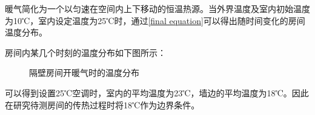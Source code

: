 暖气简化为一个以匀速在空间内上下移动的恒温热源。当外界温度及室内初始温度为10℃，室内设定温度为25℃时，通过\eqref{final equation}可以得出随时间变化的房间温度分布。

房间内某几个时刻的温度分布如下图所示：
\\
\begin{figure}[h]
    \centering
    \qquad
    \qquad
    \qquad
    \qquad
    
    \caption{隔壁房间开暖气时的温度分布}
    \label{隔壁房间开暖气时的温度分布}
\end{figure}


可以得到设置25℃空调时，室内的平均温度为23℃，墙边的平均温度为18℃。因此在研究待测房间的传热过程时将18℃作为边界条件。

